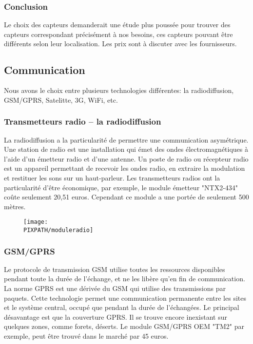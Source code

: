     \subsubsection{Conclusion}
    Le choix des capteurs demanderait une étude plus poussée
    pour trouver des capteurs correspondant précisément à nos besoins,
    ces capteurs pouvant être différents selon leur localisation.
    Les prix sont à discuter avec les fournisseurs.

\subsection{Communication}

Nous avons le choix entre plusieurs technologies différentes: la radiodiffusion, GSM/GPRS, Satelitte, 3G, WiFi, etc.

\subsubsection{Transmetteurs radio – la radiodiffusion}

La radiodiffusion a la particularité de permettre une communication asymétrique. 
Une station de radio est une installation qui émet des ondes électromagnétiques à l'aide d'un émetteur radio et d'une antenne. 
Un poste de radio ou récepteur radio est un appareil permettant de recevoir les ondes radio, en extraire la modulation et restituer les sons sur un haut-parleur.
Les transmetteurs radios ont la particularité d’être économique, par exemple, le module émetteur "NTX2-434" coûte seulement 20,51 euros. Cependant ce module a une portée de seulement 500 mètres.

    \begin{figure}[!h]
    \begin{center}
    \texttt{[image: \\PIXPATH/moduleradio]}
    \caption{}
    \end{center}
    \end{figure}

\subsubsection{GSM/GPRS}

Le protocole de transmission GSM utilise toutes les ressources disponibles pendant toute la durée de l'échange, et ne les libère qu'en fin de communication.
La norme GPRS est une dérivée du GSM qui utilise des transmissions par paquets. Cette technologie permet une communication permanente entre les sites et le système central, occupé que pendant la durée de l'échangées.
Le principal désavantage est que la couverture GPRS. Il se trouve encore inexistant sur quelques zones, comme forets, déserts.
Le module GSM/GPRS OEM "TM2" par exemple, peut être trouvé dans le marché par 45 euros. 

